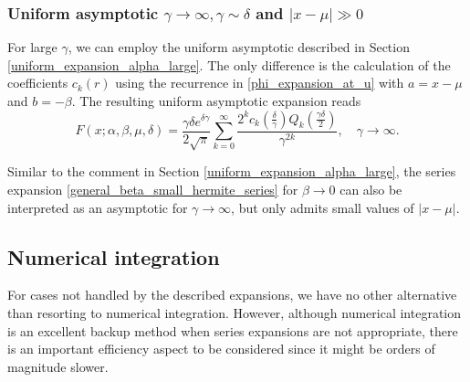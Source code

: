 \documentclass[10pt,a4paper,oneside]{article}
\numberwithin{equation}{section}
\begin{document}
\subsubsection{Uniform asymptotic $\gamma \to \infty, \gamma \sim \delta$ and $|x-\mu| \gg 0$}
For large $\gamma$, we can employ the uniform asymptotic described in Section \ref{uniform_expansion_alpha_large}. The only difference is the calculation of the coefficients $c_k(r)$ using the recurrence in \eqref{phi_expansion_at_u} with $a = x-\mu$ and $b = -\beta$. The resulting uniform asymptotic expansion reads
\begin{equation}
F(x; \alpha, \beta, \mu, \delta) = \frac{\gamma \delta e^{\delta \gamma}}{2\sqrt{\pi}} \sum_{k=0}^{\infty} \frac{2^k c_k\left(\frac{\delta}{\gamma}\right) Q_k\left(\frac{\gamma\delta}{2}\right)}{\gamma^{2k}}, \quad \gamma \to \infty.
\end{equation}

Similar to the comment in Section \ref{uniform_expansion_alpha_large}, the series expansion \eqref{general_beta_small_hermite_series} for $\beta \to 0$ can also be interpreted as an asymptotic for $\gamma \to \infty$, but only admits small values of $|x-\mu|$.

\subsection{Numerical integration}\label{section_numerical_integration}

For cases not handled by the described expansions, we have no other alternative than resorting to numerical integration. However, although numerical integration is an excellent backup method when series expansions are not appropriate, there is an important efficiency aspect to be considered since it might be orders of magnitude slower. 
\end{document}
